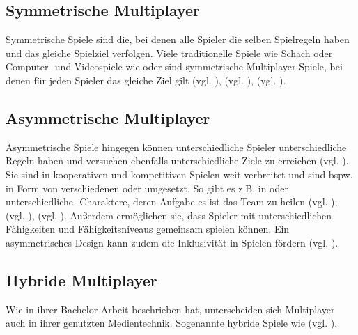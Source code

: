 \subsection{Symmetrische Multiplayer}
Symmetrische Spiele sind die, bei denen alle Spieler die selben Spielregeln haben und das gleiche Spielziel verfolgen. Viele traditionelle Spiele wie Schach oder Computer- und Videospiele wie  oder  sind symmetrische Multiplayer-Spiele, bei denen für jeden Spieler das gleiche Ziel gilt (vgl. \cite[S. 12]{adams_fundamentals_2013}), (vgl. \cite{noauthor_mario_nodate}), (vgl. \cite{noauthor_willkommen_nodate}). 


\subsection{Asymmetrische Multiplayer}
Asymmetrische Spiele hingegen können unterschiedliche Spieler unterschiedliche Regeln haben und versuchen ebenfalls unterschiedliche Ziele zu erreichen (vgl. \cite[S. 12]{adams_fundamentals_2013}). Sie sind in kooperativen und kompetitiven Spielen weit verbreitet und sind bspw. in Form von verschiedenen  oder  umgesetzt. So gibt es z.B. in  oder   unterschiedliche -Charaktere, deren Aufgabe es ist das Team zu heilen (vgl. \cite{smilovitch_birdquestvr_2019}), (vgl. \cite{noauthor_league_2025}), (vgl. \cite{noauthor_overwatch_nodate}). 
Außerdem ermöglichen sie, dass Spieler mit unterschiedlichen Fähigkeiten und Fähigkeitsniveaus gemeinsam spielen können. Ein asymmetrisches Design kann zudem die Inklusivität in Spielen fördern (vgl. \cite{smilovitch_birdquestvr_2019}).

\subsection{Hybride Multiplayer}
Wie \cite[S. 6f]{lotz_konzeption_2021} in ihrer Bachelor-Arbeit beschrieben hat, unterscheiden sich Multiplayer auch in ihrer genutzten Medientechnik. Sogenannte hybride Spiele wie  (vgl. \cite{noauthor_mario_nodate-1}).


